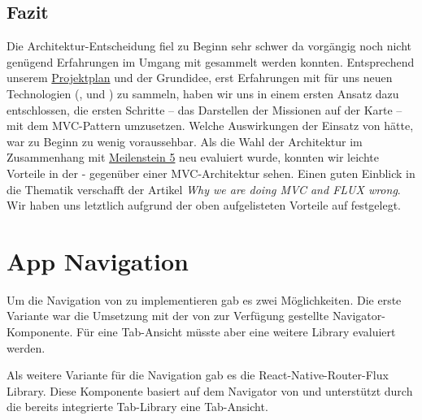 \subsection{Fazit}
Die Architektur-Entscheidung fiel zu Beginn sehr schwer da vorgängig noch nicht genügend Erfahrungen im Umgang mit  gesammelt werden konnten.
Entsprechend unserem \hyperref[pm-projektplan]{Projektplan} und der Grundidee, erst Erfahrungen mit für uns neuen Technologien (,  und ) zu sammeln, haben wir uns in einem ersten Ansatz dazu entschlossen, die ersten Schritte -- das Darstellen der Missionen auf der Karte -- mit dem \gls{MVC}-Pattern umzusetzen.
Welche Auswirkungen der Einsatz von  hätte, war zu Beginn zu wenig voraussehbar.\newline
Als die Wahl der Architektur im Zusammenhang mit \hyperref[pm-ms5]{Meilenstein 5} neu evaluiert wurde, konnten wir leichte Vorteile in der - gegenüber einer MVC-Architektur sehen.
Einen guten Einblick in die Thematik verschafft der Artikel \emph{Why we are doing MVC and FLUX wrong}\cite{mvc-vs-flux}.\newline
Wir haben uns letztlich aufgrund der oben aufgelisteten Vorteile auf  festgelegt.

\section{App Navigation}
Um die Navigation von \kort{} zu implementieren gab es zwei Möglichkeiten. 
Die erste Variante war die Umsetzung mit der von  zur Verfügung gestellte Navigator-Komponente. 
Für eine Tab-Ansicht müsste aber eine weitere Library evaluiert werden. 

Als weitere Variante für die Navigation gab es die React-Native-Router-Flux Library. 
Diese Komponente basiert auf dem Navigator von  und unterstützt durch die bereits integrierte Tab-Library eine Tab-Ansicht.  

